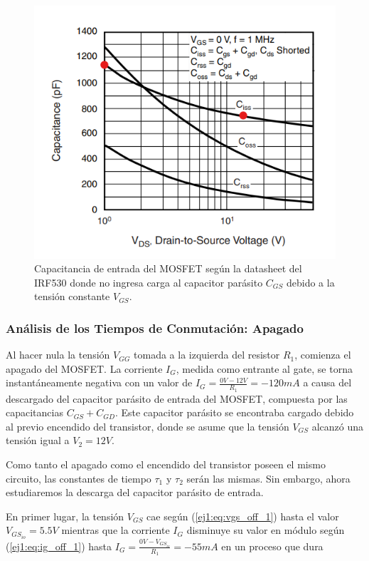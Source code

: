 \begin{figure}[H]
	\centering
	\includegraphics[width=0.8\linewidth]{ImagenesEjercicio-1/Vds-C}
	\caption{Capacitancia de entrada del MOSFET según la datasheet del IRF530 donde no ingresa carga al capacitor parásito $C_{GS}$ debido a la tensión constante $V_{GS}$.}
	\label{ej1:fig:cgd}
\end{figure}

\subsubsection{Análisis de los Tiempos de Conmutación: Apagado}

Al hacer nula la tensión $V_{GG}$ tomada a la izquierda del resistor $R_1$, comienza el apagado del MOSFET. La corriente $I_G$, medida como entrante al gate, se torna instantáneamente negativa con un valor de $I_G = \frac{0V-12V}{R_1} = -120mA$ a causa del descargado del capacitor parásito de entrada del MOSFET, compuesta por las capacitancias $C_{GS} + C_{GD}$. Este capacitor parásito se encontraba cargado debido al previo encendido del transistor, donde se asume que la tensión $V_{GS}$ alcanzó una tensión igual a $V_2 = 12V$.

Como tanto el apagado como el encendido del transistor poseen el mismo circuito, las constantes de tiempo $\tau_1$ y $\tau_2$ serán las mismas. Sin embargo, ahora estudiaremos la descarga del capacitor parásito de entrada.

En primer lugar, la tensión $V_{GS}$ cae según (\ref{ej1:eq:vgs_off_1}) hasta el valor $V_{GS_{io}} = 5.5V$ mientras que la corriente $I_G$ disminuye su valor en módulo según (\ref{ej1:eq:ig_off_1}) hasta $I_G = \frac{0V - V_{GS_{io}}}{R_1} = -55mA$ en un proceso que dura

